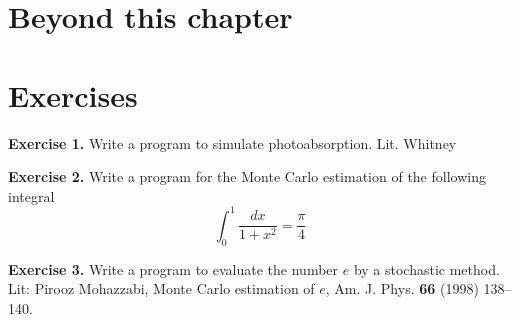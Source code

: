 \section{Beyond this chapter}


\section{Exercises}
{\bf Exercise 1.} Write a program to simulate photoabsorption.
    Lit. Whitney

{\bf Exercise 2.} Write a program for the Monte Carlo estimation of
the following integral
\begin{equation}
\int_0^1\frac{dx}{1+x^2} = \frac{\pi}{4}
\end{equation}

{\bf Exercise 3.} Write a program to evaluate the number $e$ by a
stochastic method.
Lit: Pirooz Mohazzabi, Monte Carlo estimation of $e$,
Am. J. Phys. {\bf 66} (1998) 138--140.


